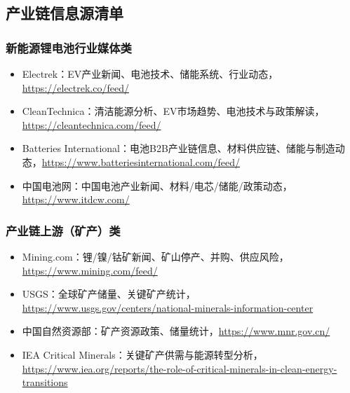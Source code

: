 ﻿\documentclass[12pt,a4paper]{article}
\begin{document}
\subsection{产业链信息源清单}
\subsubsection{新能源锂电池行业媒体类}
\begin{itemize}
    \item Electrek：EV产业新闻、电池技术、储能系统、行业动态，\url{https://electrek.co/feed/}
    \item CleanTechnica：清洁能源分析、EV市场趋势、电池技术与政策解读，\url{https://cleantechnica.com/feed/}
    \item Batteries International：电池B2B产业链信息、材料供应链、储能与制造动态，\url{https://www.batteriesinternational.com/feed/}
    \item 中国电池网：中国电池产业新闻、材料/电芯/储能/政策动态，\url{https://www.itdcw.com/}
\end{itemize}

\subsubsection{产业链上游（矿产）类}
\begin{itemize}
    \item Mining.com：锂/镍/钴矿新闻、矿山停产、并购、供应风险，\url{https://www.mining.com/feed/}
    \item USGS：全球矿产储量、关键矿产统计，\url{https://www.usgs.gov/centers/national-minerals-information-center}
    \item 中国自然资源部：矿产资源政策、储量统计，\url{https://www.mnr.gov.cn/}
    \item IEA Critical Minerals：关键矿产供需与能源转型分析，\url{https://www.iea.org/reports/the-role-of-critical-minerals-in-clean-energy-transitions}
\end{itemize}
\end{document}
